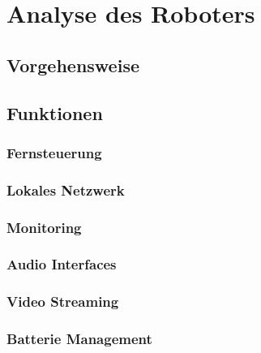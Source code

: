 \section{Analyse des Roboters}


\subsection{Vorgehensweise}



\subsection{Funktionen}


\subsubsection{Fernsteuerung}
\subsubsection{Lokales Netzwerk}
\subsubsection{Monitoring}
\subsubsection{Audio Interfaces}
\subsubsection{Video Streaming} %
\subsubsection{Batterie Management}